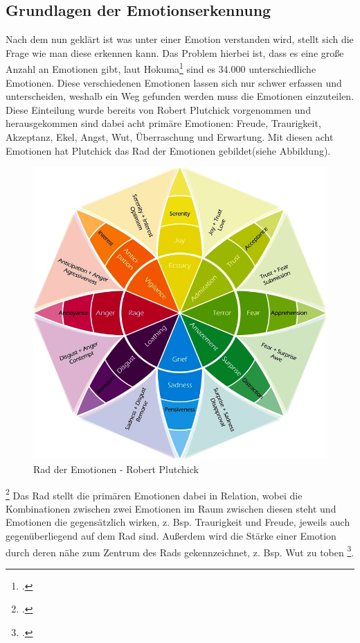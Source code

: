 \subsection{Grundlagen der Emotionserkennung}
Nach dem nun geklärt ist was unter einer Emotion verstanden wird, stellt sich die Frage wie man diese erkennen kann. Das Problem hierbei ist, dass es eine große Anzahl an Emotionen gibt, laut Hokuma\footcite[Vgl.][Absch. 1]{Hok17} sind es 34.000 unterschiedliche Emotionen. Diese verschiedenen Emotionen lassen sich nur schwer erfassen und unterscheiden, weshalb ein Weg gefunden werden muss die Emotionen einzuteilen. Diese Einteilung wurde bereits von Robert Plutchick vorgenommen und herausgekommen sind dabei acht primäre Emotionen: Freude, Traurigkeit, Akzeptanz, Ekel, Angst, Wut, Überraschung und Erwartung.
Mit diesen acht Emotionen hat Plutchick das Rad der Emotionen gebildet(siehe Abbildung).
\begin{figure}[h]
	\centering
	\includegraphics[width=16cm]{Bilder/wheel-of-emotions.png}
	\caption[Rad der Emotionen - Robert Plutchick]{Rad der Emotionen - Robert Plutchick\footnotemark}
\end{figure}%
\footcitetext[Vgl.][]{Hok17}
\newline
Das Rad stellt die primären Emotionen dabei in Relation, wobei die Kombinationen zwischen zwei Emotionen im Raum zwischen diesen steht und Emotionen die gegensätzlich wirken, z. Bsp. Traurigkeit und Freude, jeweils auch gegenüberliegend auf dem Rad sind. Außerdem wird die Stärke einer Emotion durch deren nähe zum Zentrum des Rads gekennzeichnet, z. Bsp. Wut zu toben \footcite[Vgl.][Absch. Elements of the Wheel]{Hok17}.
